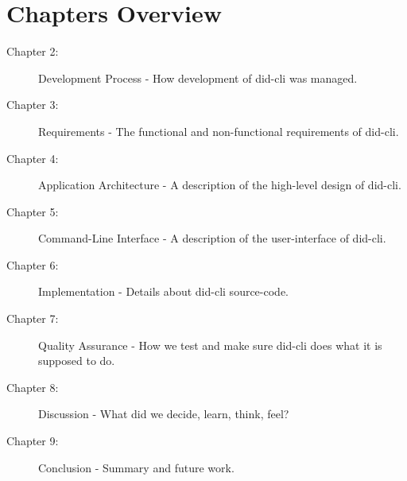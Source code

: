\section{Chapters Overview}

\begin{description}
    \item[Chapter 2:] Development Process - How development of \acrshort{did-cli} was managed.
    \item[Chapter 3:] Requirements - The functional and non-functional requirements of \acrshort{did-cli}.
    \item[Chapter 4:] Application Architecture - A description of the high-level design of \acrshort{did-cli}.
    \item[Chapter 5:] Command-Line Interface - A description of the user-interface of \acrshort{did-cli}.
    \item[Chapter 6:] Implementation - Details about \acrshort{did-cli} source-code.
    \item[Chapter 7:] Quality Assurance - How we test and make sure \acrshort{did-cli} does what it is supposed to do. 
    \item[Chapter 8:] Discussion - What did we decide, learn, think, feel?
    \item[Chapter 9:] Conclusion - Summary and future work.
\end{description}
